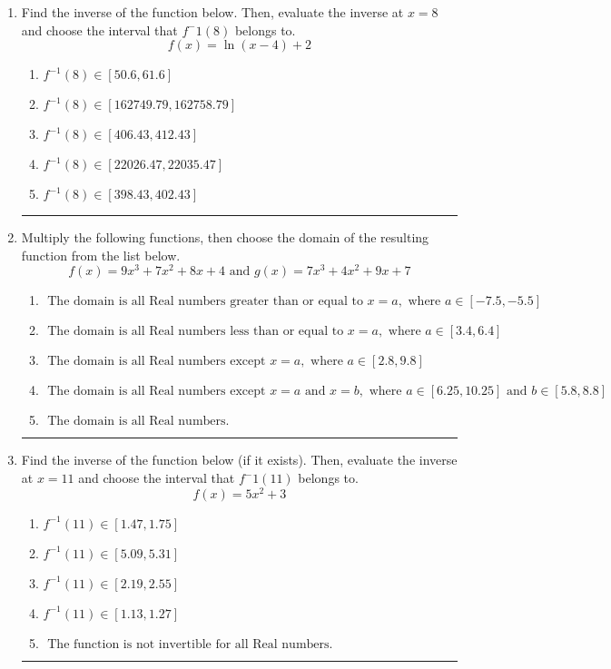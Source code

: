 \documentclass[14pt]{extbook}
\newcommand{\litem}[1]{\item#1\hspace*{-1cm}\rule{\textwidth}{0.4pt}}
\begin{document}
\begin{enumerate}
{\begin{enumerate}[label=\Alph*.]
\end{enumerate} }
\litem{
Find the inverse of the function below. Then, evaluate the inverse at $x = 8$ and choose the interval that $f^-1(8)$ belongs to.\[ f(x) = \ln{(x-4)}+2 \]\begin{enumerate}[label=\Alph*.]
\item \( f^{-1}(8) \in [50.6, 61.6] \)
\item \( f^{-1}(8) \in [162749.79, 162758.79] \)
\item \( f^{-1}(8) \in [406.43, 412.43] \)
\item \( f^{-1}(8) \in [22026.47, 22035.47] \)
\item \( f^{-1}(8) \in [398.43, 402.43] \)

\end{enumerate} }
\litem{
Multiply the following functions, then choose the domain of the resulting function from the list below.\[ f(x) = 9x^{3} +7 x^{2} +8 x + 4 \text{ and } g(x) = 7x^{3} +4 x^{2} +9 x + 7 \]\begin{enumerate}[label=\Alph*.]
\item \( \text{ The domain is all Real numbers greater than or equal to } x = a, \text{ where } a \in [-7.5, -5.5] \)
\item \( \text{ The domain is all Real numbers less than or equal to } x = a, \text{ where } a \in [3.4, 6.4] \)
\item \( \text{ The domain is all Real numbers except } x = a, \text{ where } a \in [2.8, 9.8] \)
\item \( \text{ The domain is all Real numbers except } x = a \text{ and } x = b, \text{ where } a \in [6.25, 10.25] \text{ and } b \in [5.8, 8.8] \)
\item \( \text{ The domain is all Real numbers. } \)

\end{enumerate} }
\litem{
Find the inverse of the function below (if it exists). Then, evaluate the inverse at $x = 11$ and choose the interval that $f^-1(11)$ belongs to.\[ f(x) = 5 x^2 + 3 \]\begin{enumerate}[label=\Alph*.]
\item \( f^{-1}(11) \in [1.47, 1.75] \)
\item \( f^{-1}(11) \in [5.09, 5.31] \)
\item \( f^{-1}(11) \in [2.19, 2.55] \)
\item \( f^{-1}(11) \in [1.13, 1.27] \)
\item \( \text{ The function is not invertible for all Real numbers. } \)


\end{enumerate}}
\end{enumerate}
\end{document}
